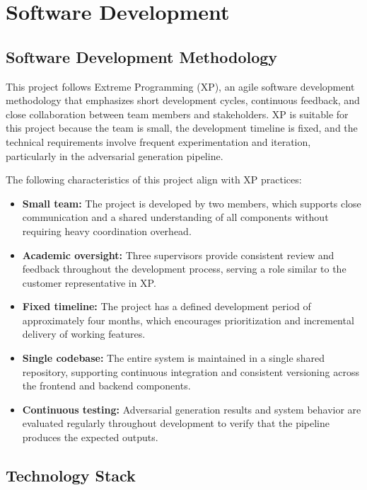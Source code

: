\chapter{Software Development}
\label{chap:software-development}

\section{Software Development Methodology}
\label{section:software-development-methodology}

This project follows Extreme Programming (XP), an agile
software development methodology that emphasizes short
development cycles, continuous feedback, and close
collaboration between team members and stakeholders. XP
is suitable for this project because the team is small,
the development timeline is fixed, and the technical
requirements involve frequent experimentation and
iteration, particularly in the adversarial generation
pipeline.

The following characteristics of this project align
with XP practices:

\begin{itemize}
    \item \textbf{Small team:} The project is developed
    by two members, which supports close communication
    and a shared understanding of all components without
    requiring heavy coordination overhead.
    \item \textbf{Academic oversight:} Three supervisors
    provide consistent review and feedback throughout
    the development process, serving a role similar to
    the customer representative in XP.
    \item \textbf{Fixed timeline:} The project has a
    defined development period of approximately four
    months, which encourages prioritization and
    incremental delivery of working features.
    \item \textbf{Single codebase:} The entire system
    is maintained in a single shared repository,
    supporting continuous integration and consistent
    versioning across the frontend and backend components.
    \item \textbf{Continuous testing:} Adversarial
    generation results and system behavior are evaluated
    regularly throughout development to verify that the
    pipeline produces the expected outputs.
\end{itemize}

\section{Technology Stack}
\label{section:technology-stack}

